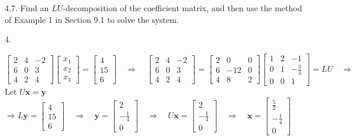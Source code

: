 \documentclass[12pt]{book}
\begin{document}
\begin{CJK}{UTF8}{bsmi}
4,7. Find an $LU$-decomposition of the coefficient matrix, and then use the method of Example 1 in Section 9.1 to solve the system.

4. \begin{minipage}[t]{\dimexpr\linewidth-2em}
$\begin{bmatrix}
2 & 4 & -2 \\
6 & 0 & 3  \\
4 & 2 & 4
\end{bmatrix}\begin{bmatrix}
x_1 \\ x_2 \\ x_3
\end{bmatrix}=\begin{bmatrix}
4 \\ 15 \\ 6
\end{bmatrix}\quad\Rightarrow\quad\begin{bmatrix}
2 & 4 & -2 \\
6 & 0 & 3  \\
4 & 2 & 4
\end{bmatrix}=\begin{bmatrix}
2 & 0 & 0 \\
6 &-12& 0  \\
4 & 8 & 2
\end{bmatrix}\begin{bmatrix}
1 & 2 & -1 \\
0 & 1 & -\frac{3}{4}  \\
0 & 0 & 1
\end{bmatrix}=LU\quad\Rightarrow\quad$ Let $U\textbf{x}=\textbf{y}$ \\
$\Rightarrow L\textbf{y}=\begin{bmatrix}
4 \\ 15 \\ 6
\end{bmatrix}\quad\Rightarrow\quad\textbf{y}=\begin{bmatrix}
2 \\ -\frac{1}{4} \\ 0
\end{bmatrix}\quad\Rightarrow\quad U\textbf{x}=\begin{bmatrix}
2 \\ -\frac{1}{4} \\ 0
\end{bmatrix}\quad\Rightarrow\quad\textbf{x}=\begin{bmatrix}
\frac{5}{2} \\ -\frac{1}{4} \\ 0
\end{bmatrix}$
\end{minipage}\\


\end{CJK}
\end{document}
